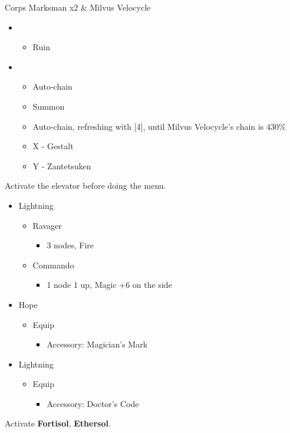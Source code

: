 \begin{battle}{Corps Marksman x2 \& Milvus Velocycle}
\begin{itemize}
    \item \first
    \begin{itemize}
        \item Ruin
    \end{itemize}
    \item \fifth
    \begin{itemize}
        \item Auto-chain
        \item Summon
        \item Auto-chain, refreshing with [4], until Milvus Velocycle's chain is 430\%
        \item X - Gestalt
        \item Y - Zantetsuken
    \end{itemize}
\end{itemize}
\end{battle}
Activate the elevator before doing the menu.
\begin{menu}
\begin{itemize}
    \crystarium
    \begin{itemize}
        \item Lightning
        \begin{itemize}
            \item Ravager
            \begin{itemize}
                \item 3 nodes, Fire
            \end{itemize}
            \item Commando
            \begin{itemize}
                \item 1 node 1 up, Magic +6 on the side
            \end{itemize}
        \end{itemize}
    \end{itemize}
    \equip
    \begin{itemize}
        \item Hope
        \begin{itemize}
            \item Equip
            \begin{itemize}
                \item Accessory: Magician's Mark
            \end{itemize}
        \end{itemize}
        \item Lightning
        \begin{itemize}
            \item Equip
            \begin{itemize}
                \item Accessory: Doctor's Code
            \end{itemize}
        \end{itemize}
    \end{itemize}
\end{itemize}
\end{menu}
Activate \textbf{Fortisol}, \textbf{Ethersol}.

